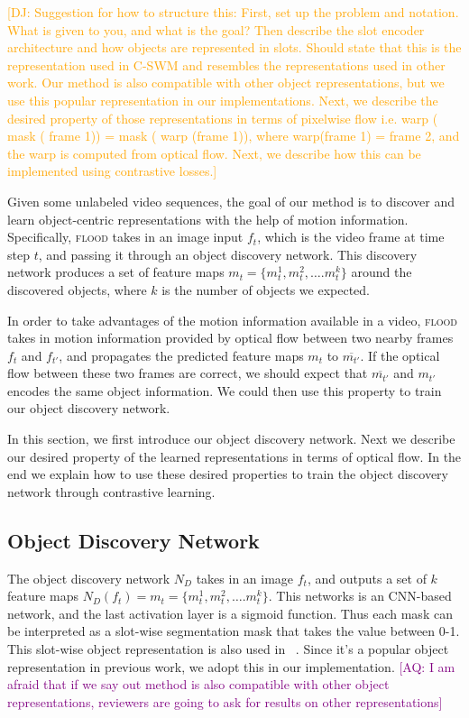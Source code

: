 \documentclass{article}
\newcommand{\jd}[1]{\textcolor{orange}{[DJ: #1]}}
\newcommand{\aq}[1]{\textcolor{purple}{[AQ: #1]}}
\begin{document}
\jd{Suggestion for how to structure this: First, set up the problem and notation. What is given to you, and what is the goal? Then describe the slot encoder architecture and how objects are represented in slots. Should state that this is the representation used in C-SWM and resembles the representations used in other work. Our method is also compatible with other object representations, but we use this popular representation in our implementations. Next, we describe the desired property of those representations in terms of pixelwise flow i.e. warp ( mask ( frame 1)) = mask ( warp (frame 1)), where  warp(frame 1) = frame 2, and the warp is computed from optical flow. Next, we describe how this can be implemented using contrastive losses.}


Given some unlabeled video sequences, the goal of our method is to discover and learn object-centric representations with the help of motion information. Specifically, \textsc{flood} takes in an image input $f_t$, which is the video frame at time step $t$, and passing it through an object discovery network. This discovery network produces a set of feature maps $m_t = \{m_{t}^1, m_{t}^2, \dots. m_{t}^k \}$ around the discovered objects, where $k$ is the number of objects we expected. 

In order to take advantages of the motion information available in a video, \textsc{flood} takes in motion information provided by optical flow between two nearby frames $f_{t}$ and $f_{t'}$, and propagates the predicted feature maps $m_{t}$ to $\overline{m_{t'}}$. If the optical flow between these two frames are correct, we should expect that $\overline{m_{t'}}$ and $m_{t'}$ encodes the same object information. We could then use this property to train our object discovery network.

In this section, we first introduce our object discovery network. Next we describe our desired property of the learned representations in terms of optical flow. In the end we explain how to use these desired properties to train the object discovery network through contrastive learning. 

\subsection{Object Discovery Network}
The object discovery network $N_D$ takes in an image $f_t$, and outputs a set of $k$ feature maps $N_D(f_t) = m_t = \{m_{t}^1, m_{t}^2, \dots. m_{t}^k \}$. This networks is an CNN-based network, and the last activation layer is a sigmoid function. Thus each mask can be interpreted as a slot-wise segmentation mask that takes the value between 0-1. This slot-wise object representation is also used in ~\cite{kipf2019contrastive, locatello2020object}. Since it's a popular object representation in previous work, we adopt this in our implementation. \aq{I am afraid that if we say out method is also compatible with other object representations, reviewers are going to ask for results on other representations}
\end{document}
